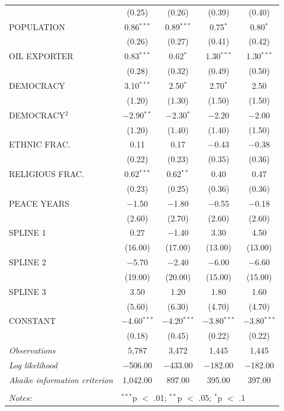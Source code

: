 \documentclass[11pt,article,oneside]{memoir}
\begin{document}
\begin{table}[!htbp]
\begin{tabular}{@{\extracolsep{5pt}}lcccc}
  & (0.25) & (0.26) & (0.39) & (0.40) \\ 
  POPULATION & 0.86$^{***}$ & 0.89$^{***}$ & 0.75$^{*}$ & 0.80$^{*}$ \\ 
  & (0.26) & (0.27) & (0.41) & (0.42) \\ 
  OIL EXPORTER & 0.83$^{***}$ & 0.62$^{*}$ & 1.30$^{***}$ & 1.30$^{***}$ \\ 
  & (0.28) & (0.32) & (0.49) & (0.50) \\ 
  DEMOCRACY & 3.10$^{***}$ & 2.50$^{*}$ & 2.70$^{*}$ & 2.50 \\ 
  & (1.20) & (1.30) & (1.50) & (1.50) \\ 
  DEMOCRACY$^2$ & $-$2.90$^{**}$ & $-$2.30$^{*}$ & $-$2.20 & $-$2.00 \\ 
  & (1.20) & (1.40) & (1.40) & (1.50) \\ 
  ETHNIC FRAC. & 0.11 & 0.17 & $-$0.43 & $-$0.38 \\ 
  & (0.22) & (0.23) & (0.35) & (0.36) \\ 
  RELIGIOUS FRAC. & 0.62$^{***}$ & 0.62$^{**}$ & 0.40 & 0.47 \\ 
  & (0.23) & (0.25) & (0.36) & (0.36) \\ 
  PEACE YEARS & $-$1.50 & $-$1.80 & $-$0.55 & $-$0.18 \\ 
  & (2.60) & (2.70) & (2.60) & (2.60) \\ 
  SPLINE 1 & 0.27 & $-$1.40 & 3.30 & 4.50 \\ 
  & (16.00) & (17.00) & (13.00) & (13.00) \\ 
  SPLINE 2 & $-$5.70 & $-$2.40 & $-$6.00 & $-$6.60 \\ 
  & (19.00) & (20.00) & (15.00) & (15.00) \\ 
  SPLINE 3 & 3.50 & 1.20 & 1.80 & 1.60 \\ 
  & (5.60) & (6.30) & (4.70) & (4.70) \\ 
  CONSTANT & $-$4.60$^{***}$ & $-$4.20$^{***}$ & $-$3.80$^{***}$ & $-$3.80$^{***}$ \\ 
  & (0.18) & (0.45) & (0.22) & (0.22) \\ 
 \textit{Observations} & 5,787 & 3,472 & 1,445 & 1,445 \\ 
\textit{Log likelihood} & $-$506.00 & $-$433.00 & $-$182.00 & $-$182.00 \\ 
\textit{Akaike information criterion} & 1,042.00 & 897.00 & 395.00 & 397.00 \\ 
\hline \\[-1.8ex] 
\textit{Notes:} & \multicolumn{4}{l}{$^{***}$p $<$ .01; $^{**}$p $<$ .05; $^{*}$p $<$ .1} \\ 
\end{tabular} 
\end{table}
\end{document}
